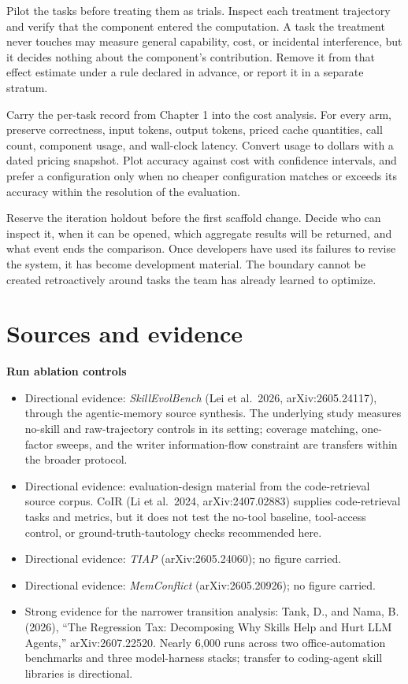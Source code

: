 Pilot the tasks before treating them as trials. Inspect each treatment trajectory and verify that the component entered the computation. A task the treatment never touches may measure general capability, cost, or incidental interference, but it decides nothing about the component's contribution. Remove it from that effect estimate under a rule declared in advance, or report it in a separate stratum.

Carry the per-task record from Chapter 1 into the cost analysis. For every arm, preserve correctness, input tokens, output tokens, priced cache quantities, call count, component usage, and wall-clock latency. Convert usage to dollars with a dated pricing snapshot. Plot accuracy against cost with confidence intervals, and prefer a configuration only when no cheaper configuration matches or exceeds its accuracy within the resolution of the evaluation.

Reserve the iteration holdout before the first scaffold change. Decide who can inspect it, when it can be opened, which aggregate results will be returned, and what event ends the comparison. Once developers have used its failures to revise the system, it has become development material. The boundary cannot be created retroactively around tasks the team has already learned to optimize.

\section*{Sources and evidence}

\textbf{Run ablation controls}

\begin{itemize}
\tightlist
\item
  Directional evidence: \emph{SkillEvolBench} (Lei et al.~2026, arXiv:2605.24117), through the agentic-memory source synthesis. The underlying study measures no-skill and raw-trajectory controls in its setting; coverage matching, one-factor sweeps, and the writer information-flow constraint are transfers within the broader protocol.
\item
  Directional evidence: evaluation-design material from the code-retrieval source corpus. CoIR (Li et al.~2024, arXiv:2407.02883) supplies code-retrieval tasks and metrics, but it does not test the no-tool baseline, tool-access control, or ground-truth-tautology checks recommended here.
\item
  Directional evidence: \emph{TIAP} (arXiv:2605.24060); no figure carried.
\item
  Directional evidence: \emph{MemConflict} (arXiv:2605.20926); no figure carried.
\item
  Strong evidence for the narrower transition analysis: Tank, D., and Nama, B. (2026), ``The Regression Tax: Decomposing Why Skills Help and Hurt LLM Agents,'' arXiv:2607.22520. Nearly 6,000 runs across two office-automation benchmarks and three model-harness stacks; transfer to coding-agent skill libraries is directional.
\end{itemize}

